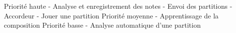 Priorité haute\newline
- Analyse et enregistrement des notes\newline
- Envoi des partitions\newline
- Accordeur\newline
- Jouer une partition\newline
\newline
Priorité moyenne\newline
- Apprentissage de la composition\newline
\newline
Priorité basse\newline
- Analyse automatique d'une partition\newline
